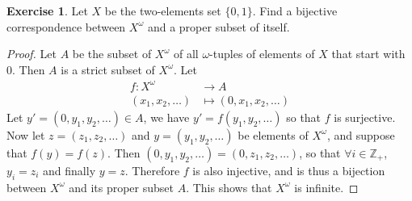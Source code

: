 \documentclass[11pt,a4paper,twoside]{article}
\theoremstyle{definition}
\newcounter{excounter}
\newtheorem{exercise}[excounter]{Exercise}
\begin{document}
\begin{exercise}

  Let $X$ be the two-elements set $\{ 0, 1 \}$. Find a bijective correspondence between $X^\omega$
  and a proper subset of itself.

\end{exercise}

\begin{proof}

  Let $A$ be the subset of $X^\omega$ of all $\omega$-tuples of elements of $X$ that start with $0$.
  Then $A$ is a strict subset of $X^\omega$. Let
  \begin{align*}
    f : X^\omega &\to A \\
    (x_1, x_2, \dotsc) &\mapsto (0, x_1, x_2, \dotsc)
  \end{align*}
  Let $y' = (0, y_1, y_2, \dotsc) \in A$, we have $y' = f (y_1, y_2, \dotsc)$ so that $f$ is surjective.
  Now let $z = (z_1, z_2, \dotsc)$ and $y = (y_1, y_2, \dotsc)$ be elements of $X^\omega$, and suppose that $f (y) = f (z)$.
  Then $(0, y_1, y_2, \dotsc) = (0, z_1, z_2, \dotsc)$, so that $\forall i \in \mathbb{Z}_+$, $y_i = z_i$ and finally $y = z$.
  Therefore $f$ is also injective, and is thus a bijection between $X^\omega$ and its proper subset $A$.
  This shows that $X^\omega$ is infinite.

\end{proof}
\end{document}
